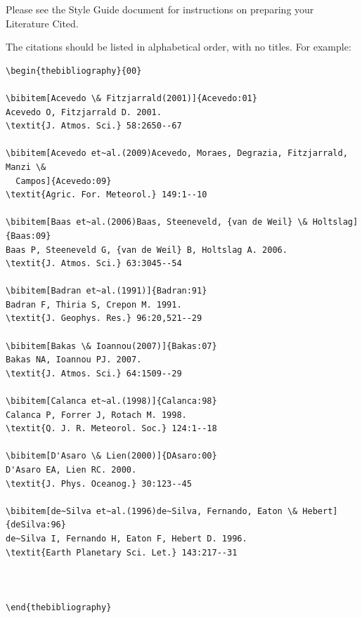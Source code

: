 \documentclass[a4paper]{ar-1col}
\begin{document}
\noindent
Please see the Style Guide document for instructions on preparing your Literature Cited.

The citations should be listed in alphabetical order, with no titles. For example:






\begin{verbatim}
\begin{thebibliography}{00}

\bibitem[Acevedo \& Fitzjarrald(2001)]{Acevedo:01}
Acevedo O, Fitzjarrald D. 2001.
\textit{J. Atmos. Sci.} 58:2650--67

\bibitem[Acevedo et~al.(2009)Acevedo, Moraes, Degrazia, Fitzjarrald, Manzi \&
  Campos]{Acevedo:09}
\textit{Agric. For. Meteorol.} 149:1--10

\bibitem[Baas et~al.(2006)Baas, Steeneveld, {van de Weil} \& Holtslag]{Baas:09}
Baas P, Steeneveld G, {van de Weil} B, Holtslag A. 2006.
\textit{J. Atmos. Sci.} 63:3045--54

\bibitem[Badran et~al.(1991)]{Badran:91}
Badran F, Thiria S, Crepon M. 1991.
\textit{J. Geophys. Res.} 96:20,521--29

\bibitem[Bakas \& Ioannou(2007)]{Bakas:07}
Bakas NA, Ioannou PJ. 2007.
\textit{J. Atmos. Sci.} 64:1509--29

\bibitem[Calanca et~al.(1998)]{Calanca:98}
Calanca P, Forrer J, Rotach M. 1998.
\textit{Q. J. R. Meteorol. Soc.} 124:1--18

\bibitem[D'Asaro \& Lien(2000)]{DAsaro:00}
D'Asaro EA, Lien RC. 2000.
\textit{J. Phys. Oceanog.} 30:123--45

\bibitem[de~Silva et~al.(1996)de~Silva, Fernando, Eaton \& Hebert]{deSilva:96}
de~Silva I, Fernando H, Eaton F, Hebert D. 1996.
\textit{Earth Planetary Sci. Let.} 143:217--31



\end{thebibliography}
\end{verbatim}











%
\end{document}
